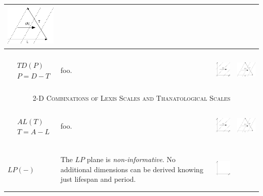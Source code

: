 \documentclass[
  12pt
]{scrartcl}
\begin{document}
\begin{center}
\begin{longtable}{m{}m{}m{}m{}}
  \includegraphics[height = 2cm]{../fig/TLa_iso.pdf}  \\
  \midrule
  $$\begin{aligned}
    &TD(P) \\
    &P = D - T
  \end{aligned}$$ &
  foo. &
  \includegraphics[height = 2cm]{../fig/TDp.pdf} &
  \includegraphics[height = 2cm]{../fig/TDp_iso.pdf}  \\
  \midrule
  \multicolumn{4}{c}{\textsc{2-D Combinations of Lexis Scales and Thanatological Scales}} \\
  \midrule
  $$\begin{aligned}
    &AL(T) \\
    &T = A - L
  \end{aligned}$$ &
  foo. &
  \includegraphics[height = 2cm]{../fig/ALt.pdf} &
  \includegraphics[height = 2cm]{../fig/ALt_iso.pdf}  \\
  \midrule
  $LP(-)$ &
  The $LP$ plane is \emph{non-informative}. No additional dimensions can be derived knowing just lifespan and period. &
  \includegraphics[height = 2cm]{../fig/LP.pdf} &

\end{longtable}
\end{center}
\end{document}

